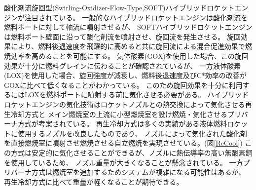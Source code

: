 酸化剤流旋回型(Swirling-Oxidizer-Flow-Type,SOFT)ハイブリッドロケットエンジンが注目されている。\cite{SOFT}
一般的なハイブリッドロケットエンジンは酸化剤流を燃料ポートに対して軸流に噴射させるが、
SOFTハイブリッドロケットエンジンは燃料ポート壁面に沿って酸化剤流を噴射させ、旋回流を発生させる。
旋回効果により、燃料後退速度を飛躍的に高めると共に旋回流による混合促進効果で燃焼効率を高めることを可能にする。
気体酸素(GOX)を使用した場合、この旋回効果が十分に燃料グレインに伝わることが確認されているが、
一方液体酸素(LOX)を使用した場合、旋回強度が減衰し、燃料後退速度及びC*効率の改善がGOXに比べて低くなることがわかっている。
このため旋回効果を十分に利用するにはLOXを燃料ポートに噴射する前に気化させる必要がある。
ハイブリッドロケットエンジンの気化技術はロケットノズルとの熱交換によって気化させる再生冷却方式と
メイン燃焼室の上流に小型燃焼室を設け燃焼・気化させるプリバーナ方式が考案されている。
再生冷却方式は多くの実績がある液体燃料ロケットに使用するノズルを改良したものであり、
ノズルによって気化された酸化剤を直接燃焼室に噴射させ燃焼させる自立燃焼を実現させている。\cite{REGENERATIVE}(図\ref{ReCool})
この方式は安定的に気化させることができるが、ノズルに熱伝導率の高い無酸素銅を使用しているため、
ノズル重量が大きくなることが懸念されている。
一方プリバーナ方式は燃焼室を追加するためシステムが複雑になる可能性はあるが、
再生冷却方式に比べて重量が軽くなることが期待できる。
